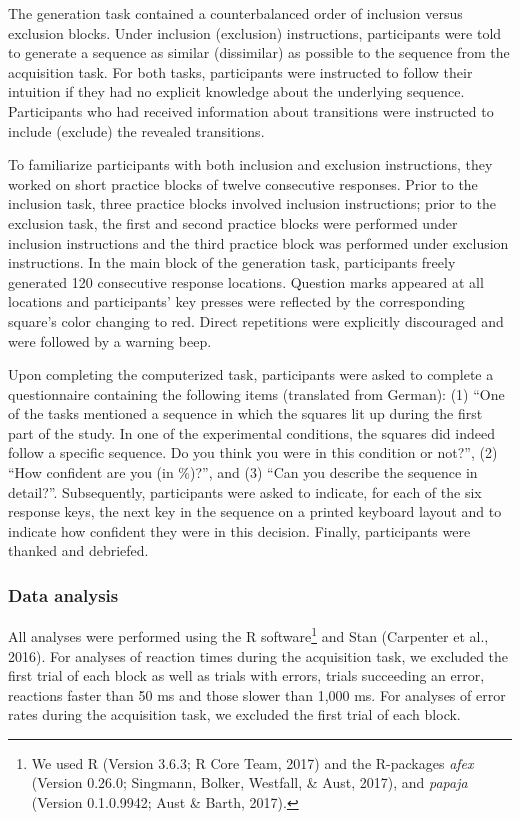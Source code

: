 \documentclass[english,,man]{apa6}
\begin{document}
The generation task contained a counterbalanced order of inclusion versus exclusion blocks.
Under inclusion (exclusion) instructions, participants were told to generate a sequence as similar (dissimilar) as possible to the sequence from the acquisition task.
For both tasks, participants were instructed to follow their intuition if they had no explicit knowledge about the underlying sequence.
Participants who had received information about transitions were instructed to include (exclude) the revealed transitions.

To familiarize participants with both inclusion and exclusion instructions, they worked on short practice blocks of twelve consecutive responses.
Prior to the inclusion task, three practice blocks involved inclusion instructions;
prior to the exclusion task, the first and second practice blocks were performed under inclusion instructions and the third practice block was performed under exclusion instructions.
In the main block of the generation task, participants freely generated 120 consecutive response locations.
Question marks appeared at all locations and participants' key presses were reflected by the corresponding square's color changing to red.
Direct repetitions were explicitly discouraged and were followed by a warning beep.

Upon completing the computerized task, participants were asked to complete a questionnaire containing the following items (translated from German):
(1) \enquote{One of the tasks mentioned a sequence in which the squares lit up during the first part of the study.
In one of the experimental conditions, the squares did indeed follow a specific sequence. Do you think you were in this condition or not?},
(2) \enquote{How confident are you (in \%)?}, and (3) \enquote{Can you describe the sequence in detail?}.
Subsequently, participants were asked to indicate, for each of the six response keys, the next key in the sequence on a printed keyboard layout and
to indicate how confident they were in this decision.
Finally, participants were thanked and debriefed.

\hypertarget{data-analysis}{%
\subsubsection{Data analysis}\label{data-analysis}}

All analyses were performed using the R software\footnote{We used R (Version 3.6.3; R Core Team, 2017) and the R-packages \emph{afex} (Version 0.26.0; Singmann, Bolker, Westfall, \& Aust, 2017), and \emph{papaja} (Version 0.1.0.9942; Aust \& Barth, 2017).} and Stan (Carpenter et al., 2016).
For analyses of reaction times during the acquisition task,
we excluded the first trial of each block as well as trials with errors, trials succeeding an error, reactions faster than 50 ms and those slower than 1,000 ms.
For analyses of error rates during the acquisition task, we excluded the first trial of each block.
\end{document}
